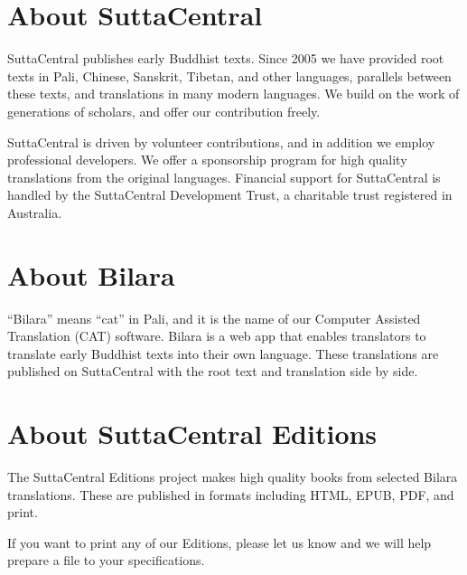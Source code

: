\documentclass[12pt,openany]{book}%
\begin{document}
\section*{About SuttaCentral}

SuttaCentral publishes early Buddhist texts. Since 2005 we have provided root texts in Pali, Chinese, Sanskrit, Tibetan, and other languages, parallels between these texts, and translations in many modern languages. We build on the work of generations of scholars, and offer our contribution freely.

SuttaCentral is driven by volunteer contributions, and in addition we employ professional developers. We offer a sponsorship program for high quality translations from the original languages. Financial support for SuttaCentral is handled by the SuttaCentral Development Trust, a charitable trust registered in Australia.

\section*{About Bilara}

“Bilara” means “cat” in Pali, and it is the name of our Computer Assisted Translation (CAT) software. Bilara is a web app that enables translators to translate early Buddhist texts into their own language. These translations are published on SuttaCentral with the root text and translation side by side.

\section*{About SuttaCentral Editions}

The SuttaCentral Editions project makes high quality books from selected Bilara translations. These are published in formats including HTML, EPUB, PDF, and print.

If you want to print any of our Editions, please let us know and we will help prepare a file to your specifications.

%
\end{document}
